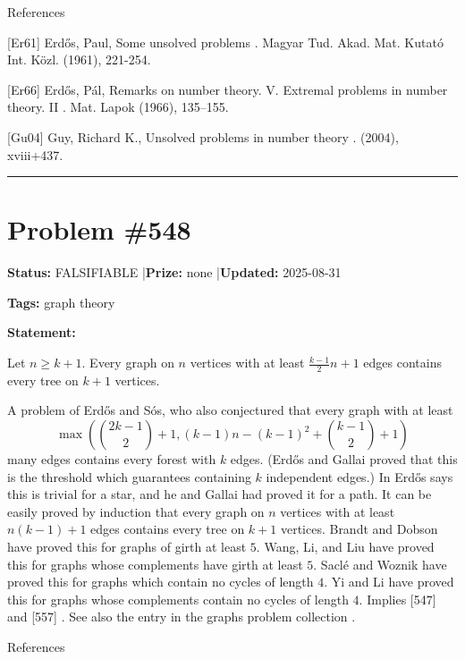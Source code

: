\documentclass{article}
\begin{document}
References

[Er61] Erd\H{o}s, Paul, Some unsolved problems . Magyar Tud. Akad. Mat. Kutat\'{o} Int. K\"{o}zl. (1961), 221-254.

[Er66] Erd\H{o}s, P\'{a}l, Remarks on number theory. {V}. {E}xtremal problems in number theory. {II} . Mat. Lapok (1966), 135--155.

[Gu04] Guy, Richard K., Unsolved problems in number theory . (2004), xviii+437.

\noindent\rule{\linewidth}{0.4pt}


\section{Problem \#548}
\label{prob:548}

\noindent\textbf{Status:} FALSIFIABLE \quad|\quad \textbf{Prize:} none \quad|\quad \textbf{Updated:} 2025-08-31

\noindent\textbf{Tags:} graph theory

\medskip

\noindent\textbf{Statement:}

Let $n\geq k+1$. Every graph on $n$ vertices with at least $\frac{k-1}{2}n+1$ edges contains every tree on $k+1$ vertices.




A problem of Erd\H{o}s and S\'{o}s, who also conjectured that every graph with at least\[\max\left( \binom{2k-1}{2}+1, (k-1)n-(k-1)^2+\binom{k-1}{2}+1\right)\]many edges contains every forest with $k$ edges. (Erd\H{o}s and Gallai \cite{ErGa59} proved that this is the threshold which guarantees containing $k$ independent edges.) In \cite{Er78} Erd\H{o}s says this is trivial for a star, and he and Gallai had proved it for a path. It can be easily proved by induction that every graph on $n$ vertices with at least $n(k-1)+1$ edges contains every tree on $k+1$ vertices. Brandt and Dobson \cite{BrDo96} have proved this for graphs of girth at least $5$. Wang, Li, and Liu \cite{WLL00} have proved this for graphs whose complements have girth at least $5$. Sacl\'{e} and Woznik \cite{SaWo97} have proved this for graphs which contain no cycles of length $4$. Yi and Li \cite{YiLi04} have proved this for graphs whose complements contain no cycles of length $4$. Implies [547] and [557] . See also the entry in the graphs problem collection .




References
\end{document}
